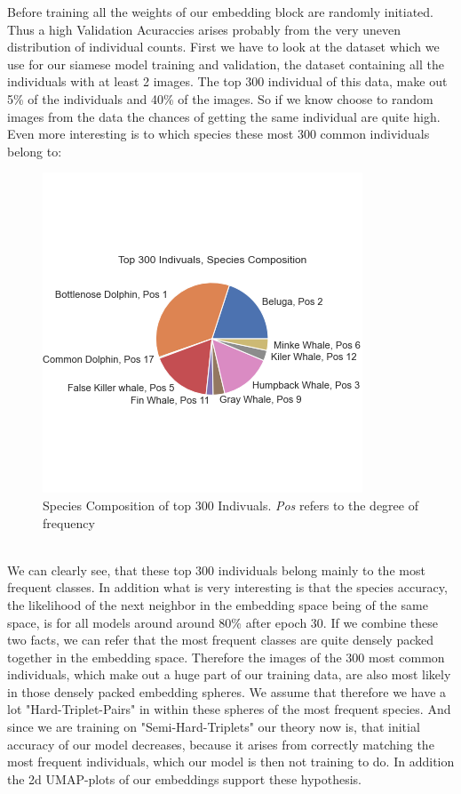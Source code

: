 \noindent Before training all the weights of our embedding block are randomly initiated. Thus a high Validation Acuraccies arises probably from the very uneven distribution of individual counts. First we have to look at the dataset which we use for our siamese model training and validation, the dataset containing all the individuals with at least 2 images. The top 300 individual of this data, make out 5\% of the individuals and 40\% of the images. So if we know choose to random images from the data the chances of getting the same individual are quite high.
Even more interesting is to which species these most 300 common individuals belong to:
\begin{figure}[ht] 
        \centering \includegraphics[width=1\columnwidth]{figures/compo.png}
        \caption{\label{fig:compo} Species Composition of top 300 Indivuals. \textit{Pos} refers to the degree of frequency}
\end{figure}\\
We can clearly see, that these top 300 individuals belong mainly to the most frequent classes. In addition what is very interesting is that the species accuracy, the likelihood of the next neighbor in the embedding space being of the same space, is for all models around around 80\% after epoch 30. If we combine these two facts, we can refer that the most frequent classes are quite densely packed together in the embedding space. Therefore the images of the 300 most common individuals, which make out a huge part of our training data, are also most likely in those densely packed embedding spheres. We assume that therefore we have a lot "Hard-Triplet-Pairs" in within these spheres of the most frequent species. And since we are training on "Semi-Hard-Triplets" our theory now is, that initial accuracy of our model decreases, because it arises from correctly matching the most frequent individuals, which our model is then not training to do.
In addition the 2d UMAP-plots of our embeddings support these hypothesis.

